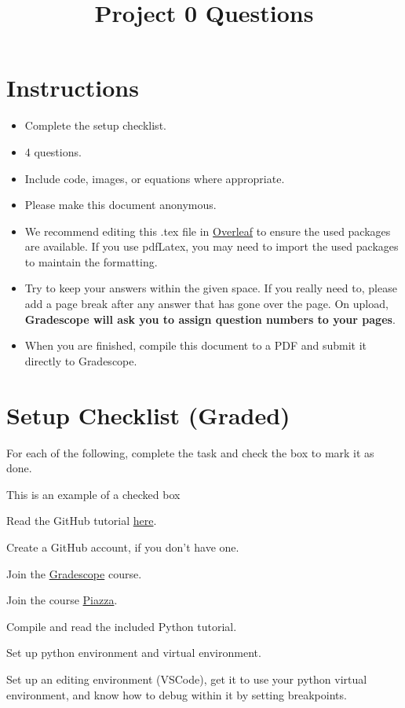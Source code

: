 \documentclass[11pt]{article}
\date{}
\title{\vspace{-1cm}Project 0 Questions}
\newcommand{\cmark}{\ding{51}}%
\newcommand{\done}{\rlap{$\square$}{\raisebox{2pt}{\large\hspace{1pt}\cmark}}%
\hspace{-2.5pt}}
\begin{document}
\maketitle
\vspace{-2cm}
\thispagestyle{fancy}

\section*{Instructions}
\begin{itemize}
  \item Complete the setup checklist.
  \item 4 questions.
  \item Include code, images, or equations where appropriate.
  \item Please make this document anonymous.
  \item We recommend editing this .tex file in \href{https://www.overleaf.com/}{Overleaf} to ensure the used packages are available. If you use pdfLatex, you may need to import the used packages to maintain the formatting. 
  \item Try to keep your answers within the given space. If you really need to, please add a page break after any answer that has gone over the page. On upload, \textbf{Gradescope will ask you to assign question numbers to your pages}.
  \item When you are finished, compile this document to a PDF and submit it directly to Gradescope.
    
\end{itemize}

\section*{Setup Checklist (Graded)}

For each of the following, complete the task and check the box to mark it as done.
\begin{todolist}
    \item[\done] This is an example of a checked box
    \item Read the GitHub tutorial \href{https://docs.google.com/document/d/1Hli-42Tv91tnghbxW4Pn44aGGeV9MMb4NgIktg9jN-U/edit?usp=sharing}{here}.
    \item Create a GitHub account, if you don't have one.
    \item Join the \href{https://www.gradescope.com/}{Gradescope} course.
    \item Join the course \href{https://piazza.com/}{Piazza}.
    \item Compile and read the included Python tutorial.
    \item Set up python environment and virtual environment.
    \item Set up an editing environment (VSCode), get it to use your python virtual environment, and know how to debug within it by setting breakpoints.
\end{todolist}
\end{document}
